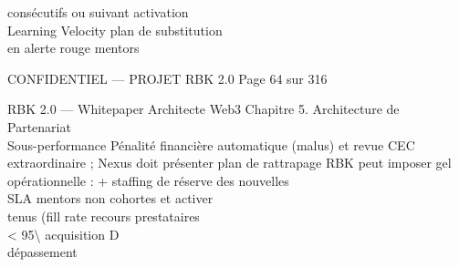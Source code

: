 \documentclass[12pt,landscape,a4paper]{article}
\newenvironment{confidential}
{\begin{tcolorbox}[
    colback=rbkred!5!white,
    colframe=rbkred!75!black,
    title=CONFIDENTIEL,
    fonttitle=\bfseries\color{white},
    coltitle=rbkred!75!black,
    breakable,
    enhanced,
    frame hidden,
    borderline west={2pt}{0pt}{rbkred!75!black}
]}
{\end{tcolorbox}}
\begin{document}
consécutifs ou                                                                                                                           suivant activation\\
Learning Velocity                                                                                                                        plan de substitution\\
en alerte rouge                                                                                                                          mentors\\
\vspace{0.5em}
\vspace{0.5em}
\vspace{0.5em}
\vspace{0.5em}
\begin{confidential}CONFIDENTIEL — PROJET RBK 2.0                                             Page 64 sur 316\end{confidential}
RBK 2.0 — Whitepaper Architecte Web3                                                                                   Chapitre 5. Architecture de Partenariat\\
\vspace{0.5em}
\vspace{0.5em}
\vspace{0.5em}
Sous-performance      Pénalité financière automatique (malus) et revue CEC extraordinaire ; Nexus doit présenter plan de rattrapage RBK peut imposer gel\\
opérationnelle :      + staffing de réserve                                                                                         des nouvelles\\
SLA mentors non                                                                                                                     cohortes et activer\\
tenus (fill rate                                                                                                                    recours prestataires\\
\textless{} 95\textbackslash{}%
acquisition                                                                                                                         D\\
dépassement\\
\end{document}
